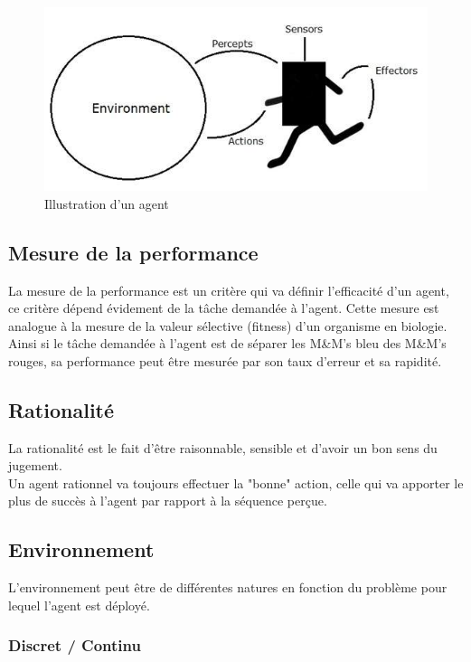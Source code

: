 \documentclass{article}
\begin{document}
\begin{figure}[h]
\begin{center}
	\includegraphics[scale=0.5]{agent_environment.jpg}
	\caption{Illustration d'un agent}
\end{center}
\end{figure}

\subsection{Mesure de la performance}

La mesure de la performance est un critère qui va définir l'efficacité d'un agent, ce critère dépend évidement de la tâche demandée à l'agent. Cette mesure est analogue à la mesure de la valeur sélective (fitness) d'un organisme en biologie. Ainsi si le tâche demandée à l'agent est de séparer les M\&M's bleu des M\&M's rouges, sa performance peut être mesurée par son taux d'erreur et sa rapidité.

\subsection{Rationalité}

La rationalité est le fait d'être raisonnable, sensible et d'avoir un bon sens du jugement.\\
Un agent rationnel va toujours effectuer la "bonne" action, celle qui va apporter le plus de succès à l'agent par rapport à la séquence perçue.

\subsection{Environnement}

L'environnement peut être de différentes natures en fonction du problème pour lequel l'agent est déployé.

\subsubsection{Discret / Continu}
\end{document}
